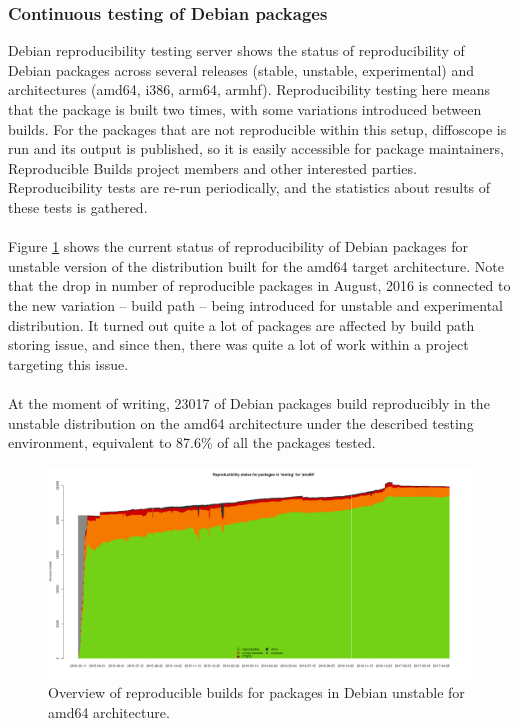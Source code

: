 {\subsubsection[Continuous testing of Debian packages]{Continuous testing of Debian packages} 
Debian reproducibility testing server \autocite{tests-rbo} shows the status of reproducibility of Debian packages across several releases (stable, unstable, experimental) and architectures (amd64, i386, arm64, armhf). Reproducibility testing here means that the package is built two times, with some variations introduced between builds. For the packages that are not reproducible within this setup, diffoscope is run and its output is published, so it is easily accessible for package maintainers, Reproducible Builds project members and other interested parties. Reproducibility tests are re-run periodically, and the statistics about results of these tests is gathered.\\\\
Figure \ref{fig:stats_sid} shows the current status of reproducibility of Debian packages for unstable version of the distribution built for the amd64 target architecture. Note that the drop in number of reproducible packages in August, 2016 is connected to the new variation -- build path -- being introduced for unstable and experimental distribution. It turned out quite a lot of packages are affected by build path storing issue, and since then, there was quite a lot of work within a project targeting this issue.\\\\
At the moment of writing, 23017 of Debian packages build reproducibly in the unstable distribution on the amd64 architecture under the described testing environment, equivalent to 87.6\% of all the packages tested.
\FloatBarrier
\begin{figure}[h]
\centering
\includegraphics[width=1.05\textwidth]{fig/stats_pkg_state.png}
\caption{\label{fig:stats_sid}Overview of reproducible builds for packages in Debian unstable for amd64 architecture. \autocite{tests-rbo}}
\end{figure}
}
